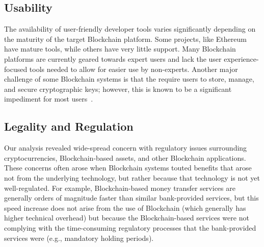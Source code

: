 \subsection{Usability} %
The availability of user-friendly developer tools varies significantly depending on the maturity of the target Blockchain platform. Some projects, like Ethereum have mature tools, while others have very little support. Many Blockchain platforms are currently geared towards expert users and lack the user experience-focused tools needed to allow for easier use by non-experts.
Another major challenge of some Blockchain systems is that the require users to store, manage, and secure cryptographic keys; however, this is known to be a significant impediment for most users~\cite{ruoti2019usability}.


\subsection{Legality and Regulation}
Our analysis revealed wide-spread concern with regulatory issues surrounding cryptocurrencies, Blockchain-based assets, and other Blockchain applications.
These concerns often arose when Blockchain systems touted benefits that arose not from the underlying technology, but rather because that technology is not yet well-regulated.
For example, Blockchain-based money transfer services are generally orders of magnitude faster than similar bank-provided services, but this speed increase does not arise from the use of Blockchain (which generally has higher technical overhead) but because the Blockchain-based services were not complying with the time-consuming regulatory processes that the bank-provided services were (e.g., mandatory holding periods).

